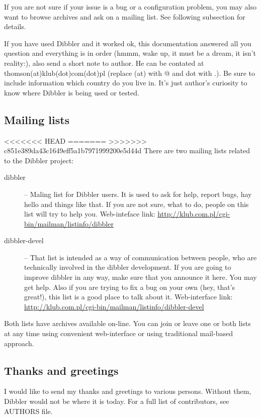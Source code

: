If you are not sure if your issue is a bug or a configuration problem,
you may also want to browse archives and ask on a mailing list. See
following subsection for details.

If you have used Dibbler and it worked ok, this documentation answered
all you question and everything is in order (hmmm, wake up, it must be
a dream, it isn't reality:), also send a short note to author. He can
be contated at thomson(at)klub(dot)com(dot)pl (replace (at) with @ and
dot with .). Be sure to include information which country do you live
in. It's just author's curiosity to know where Dibbler is being used
or tested.

\subsection{Mailing lists}
<<<<<<< HEAD
=======
\label{mailing-list}
>>>>>>> c851e389da43c1649eff5a1b7971999200e5d44d
There are two mailing lists related to the Dibbler project:
\begin{description}
\item[dibbler] -- Maling list for Dibbler users. It is used to ask for help,
report bugs, hay hello and things like that. If you are not sure, what to
do, people on this list will try to help you. Web-inteface link:
\href{http://klub.com.pl/cgi-bin/mailman/listinfo/dibbler}{http://klub.com.pl/cgi-bin/mailman/listinfo/dibbler}
\item[dibbler-devel] -- That list is intended as a way of communication
between people, who are technically involved in the dibbler development.
If you are going to improve dibbler in any way, make sure that you announce
it here. You may get help. Also if you are trying to fix a bug on your own
(hey, that's great!), this list is a good place to talk about it.
Web-interface link: \href{http://klub.com.pl/cgi-bin/mailman/listinfo/dibbler-devel}{http://klub.com.pl/cgi-bin/mailman/listinfo/dibbler-devel}
\end{description}

Both lists have archives available on-line. You can join or leave one or both lists
at any time using convenient web-interface or using traditional mail-based approach.

\subsection{Thanks and greetings}

I would like to send my thanks and greetings to various persons.
Without them, Dibbler would not be where it is today. For a full list
of contributors, see AUTHORS file.

